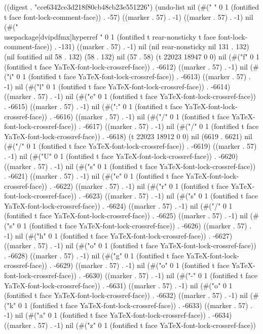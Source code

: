 
((digest . "cce6342ce3d218f80cb48cb23e551226") (undo-list nil (#("
" 0 1 (fontified t face font-lock-comment-face)) . -57) ((marker . 57) . -1) ((marker . 57) . -1) nil (#("\\usepackage[dvipdfmx]{hyperref}
" 0 1 (fontified t rear-nonsticky t face font-lock-comment-face)) . -131) ((marker . 57) . -1) nil (nil rear-nonsticky nil 131 . 132) (nil fontified nil 58 . 132) (58 . 132) nil (57 . 58) (t 22023 18947 0 0) nil (#("f" 0 1 (fontified t face YaTeX-font-lock-crossref-face)) . -6612) ((marker . 57) . -1) nil (#("i" 0 1 (fontified t face YaTeX-font-lock-crossref-face)) . -6613) ((marker . 57) . -1) nil (#("l" 0 1 (fontified t face YaTeX-font-lock-crossref-face)) . -6614) ((marker . 57) . -1) nil (#("e" 0 1 (fontified t face YaTeX-font-lock-crossref-face)) . -6615) ((marker . 57) . -1) nil (#(":" 0 1 (fontified t face YaTeX-font-lock-crossref-face)) . -6616) ((marker . 57) . -1) nil (#("/" 0 1 (fontified t face YaTeX-font-lock-crossref-face)) . -6617) ((marker . 57) . -1) nil (#("/" 0 1 (fontified t face YaTeX-font-lock-crossref-face)) . -6618) (t 22023 18912 0 0) nil (6619 . 6621) nil (#("/" 0 1 (fontified t face YaTeX-font-lock-crossref-face)) . -6619) ((marker . 57) . -1) nil (#("U" 0 1 (fontified t face YaTeX-font-lock-crossref-face)) . -6620) ((marker . 57) . -1) nil (#("s" 0 1 (fontified t face YaTeX-font-lock-crossref-face)) . -6621) ((marker . 57) . -1) nil (#("e" 0 1 (fontified t face YaTeX-font-lock-crossref-face)) . -6622) ((marker . 57) . -1) nil (#("r" 0 1 (fontified t face YaTeX-font-lock-crossref-face)) . -6623) ((marker . 57) . -1) nil (#("s" 0 1 (fontified t face YaTeX-font-lock-crossref-face)) . -6624) ((marker . 57) . -1) nil (#("/" 0 1 (fontified t face YaTeX-font-lock-crossref-face)) . -6625) ((marker . 57) . -1) nil (#("s" 0 1 (fontified t face YaTeX-font-lock-crossref-face)) . -6626) ((marker . 57) . -1) nil (#("h" 0 1 (fontified t face YaTeX-font-lock-crossref-face)) . -6627) ((marker . 57) . -1) nil (#("o" 0 1 (fontified t face YaTeX-font-lock-crossref-face)) . -6628) ((marker . 57) . -1) nil (#("g" 0 1 (fontified t face YaTeX-font-lock-crossref-face)) . -6629) ((marker . 57) . -1) nil (#("o" 0 1 (fontified t face YaTeX-font-lock-crossref-face)) . -6630) ((marker . 57) . -1) nil (#("-" 0 1 (fontified t face YaTeX-font-lock-crossref-face)) . -6631) ((marker . 57) . -1) nil (#("o" 0 1 (fontified t face YaTeX-font-lock-crossref-face)) . -6632) ((marker . 57) . -1) nil (#("k" 0 1 (fontified t face YaTeX-font-lock-crossref-face)) . -6633) ((marker . 57) . -1) nil (#("a" 0 1 (fontified t face YaTeX-font-lock-crossref-face)) . -6634) ((marker . 57) . -1) nil (#("z" 0 1 (fontified t face YaTeX-font-lock-crossref-face)) 